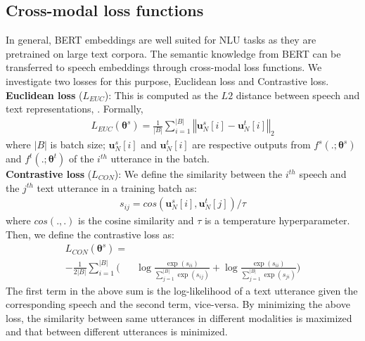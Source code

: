 \documentclass{article}
\begin{document}
\subsection{Cross-modal loss functions}
\label{subsec:cmlf}
In general, BERT embeddings are well suited for NLU tasks as they are pretrained on large text corpora. The semantic knowledge from BERT can be transferred to speech embeddings through cross-modal loss functions.
We investigate two losses for this purpose, Euclidean loss and Contrastive loss. \\ 

\noindent \textbf{Euclidean loss} ($L_{EUC}$): This is computed as the $L2$ distance between speech and text representations, \cite{huang2020leveraging}. Formally,
\begin{equation*}
    \begin{split}
        L_{EUC}(\boldsymbol\theta^s) = \frac{1}{|B|}\sum_{i=1}^{|B|}\left\Vert \textbf{u}_N^s[i] - \textbf{u}_N^t[i] \right\Vert_2
    \end{split}
\end{equation*}
where $|B|$ is batch size; $\textbf{u}_N^s[i]$ and $\textbf{u}_N^t[i]$ are respective outputs from $f^s(.;\boldsymbol\theta^s)$ and $f^t(.;\boldsymbol\theta^t)$ of the $i^{th}$ utterance in the batch.\\

\noindent \textbf{Contrastive loss} ($L_{CON}$): We define the similarity between the $i^{th}$ speech and the $j^{th}$ text utterance in a training batch as:
\begin{equation*}
    \begin{split}
        s_{ij} = cos(\textbf{u}_N^s[i], \textbf{u}_N^t[j])/\tau
    \end{split}
\end{equation*}
where $cos(.,.)$ is the cosine similarity and $\tau$ is a temperature hyperparameter. Then, we define the contrastive loss as:
\begin{equation*}
    \begin{split}
    L_{CON}(\boldsymbol\theta^s) = \\
     -\frac{1}{2|B|}\sum_{i=1}^{|B|}(&\log\frac{\exp(s_{ii})}{\sum_{j=1}^{|B|} \exp(s_{ij})} + \log\frac{\exp(s_{ii})}{\sum_{j=1}^{|B|}\exp(s_{ji})})
    \end{split}
\end{equation*}
The first term in the above sum is the log-likelihood of a text utterance given the corresponding speech and the second term, vice-versa. By minimizing the above loss, the similarity between same utterances in different modalities is maximized and that between different utterances is minimized.
\end{document}
